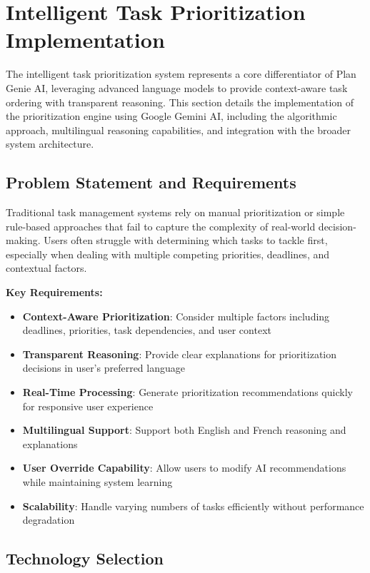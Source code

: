 \section{Intelligent Task Prioritization Implementation}

The intelligent task prioritization system represents a core differentiator of Plan Genie AI, leveraging advanced language models to provide context-aware task ordering with transparent reasoning. This section details the implementation of the prioritization engine using Google Gemini AI, including the algorithmic approach, multilingual reasoning capabilities, and integration with the broader system architecture.

\subsection{Problem Statement and Requirements}

Traditional task management systems rely on manual prioritization or simple rule-based approaches that fail to capture the complexity of real-world decision-making. Users often struggle with determining which tasks to tackle first, especially when dealing with multiple competing priorities, deadlines, and contextual factors.

\textbf{Key Requirements:}
\begin{itemize}
    \item \textbf{Context-Aware Prioritization}: Consider multiple factors including deadlines, priorities, task dependencies, and user context
    \item \textbf{Transparent Reasoning}: Provide clear explanations for prioritization decisions in user's preferred language
    \item \textbf{Real-Time Processing}: Generate prioritization recommendations quickly for responsive user experience
    \item \textbf{Multilingual Support}: Support both English and French reasoning and explanations
    \item \textbf{User Override Capability}: Allow users to modify AI recommendations while maintaining system learning
    \item \textbf{Scalability}: Handle varying numbers of tasks efficiently without performance degradation
\end{itemize}

\subsection{Technology Selection}

